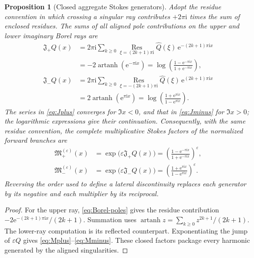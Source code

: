 \documentclass[11pt]{article}
\newtheorem{proposition}[theorem]{Proposition}
\theoremstyle{definition}
\theoremstyle{remark}
\newcommand{\eps}{\varepsilon}
\newcommand{\e}{\mathrm e}
\newcommand{\ii}{\mathrm i}
\newcommand{\Res}{\operatorname*{Res}}
\begin{document}
\begin{proposition}[Closed aggregate Stokes generators]\label{prop:aggregate-Stokes}
Adopt the residue convention in which crossing a singular ray contributes $+2\pi\ii$ times the sum of enclosed residues.  The sums of all aligned pole contributions on the upper and lower imaginary Borel rays are
\begin{align}
 \mathfrak J_{+}Q(x)
 &=2\pi\ii\sum_{k\ge0}
   \Res_{\xi=(2k+1)\pi\ii}\widehat Q(\xi)\,
   \e^{-(2k+1)\pi\ii x}\nonumber\\
 &=-2\operatorname{artanh}\!\left(\e^{-\pi\ii x}\right)
 =\log\!\left(\frac{1-\e^{-\pi\ii x}}
                    {1+\e^{-\pi\ii x}}\right),
 \label{eq:Jplus}\\
 \mathfrak J_{-}Q(x)
 &=2\pi\ii\sum_{k\ge0}
   \Res_{\xi=-(2k+1)\pi\ii}\widehat Q(\xi)\,
   \e^{(2k+1)\pi\ii x}\nonumber\\
 &=2\operatorname{artanh}\!\left(\e^{\pi\ii x}\right)
 =\log\!\left(\frac{1+\e^{\pi\ii x}}
                    {1-\e^{\pi\ii x}}\right).
 \label{eq:Jminus}
\end{align}
The series in \eqref{eq:Jplus} converges for $\Im x<0$, and that in \eqref{eq:Jminus} for $\Im x>0$; the logarithmic expressions give their continuation.  Consequently, with the same residue convention, the complete multiplicative Stokes factors of the normalized forward branches are
\begin{align}
 \mathfrak M_{+}^{(\eps)}(x)
 &=\exp\!\bigl(\eps\mathfrak J_{+}Q(x)\bigr)
 =\left(\frac{1-\e^{-\pi\ii x}}
              {1+\e^{-\pi\ii x}}\right)^{\!\eps},
 \label{eq:Mplus}\\
 \mathfrak M_{-}^{(\eps)}(x)
 &=\exp\!\bigl(\eps\mathfrak J_{-}Q(x)\bigr)
 =\left(\frac{1+\e^{\pi\ii x}}
              {1-\e^{\pi\ii x}}\right)^{\!\eps}.
 \label{eq:Mminus}
\end{align}
Reversing the order used to define a lateral discontinuity replaces each generator by its negative and each multiplier by its reciprocal.
\end{proposition}

\begin{proof}
For the upper ray, \eqref{eq:Borel-poles} gives the residue contribution
$-2\e^{-(2k+1)\pi\ii x}/(2k+1)$.  Summation uses
$\operatorname{artanh}z=\sum_{k\ge0}z^{2k+1}/(2k+1)$.  The lower-ray computation is its reflected counterpart.  Exponentiating the jump of $\eps Q$ gives \eqref{eq:Mplus}--\eqref{eq:Mminus}.  These closed factors package every harmonic generated by the aligned singularities.
\end{proof}
\end{document}
